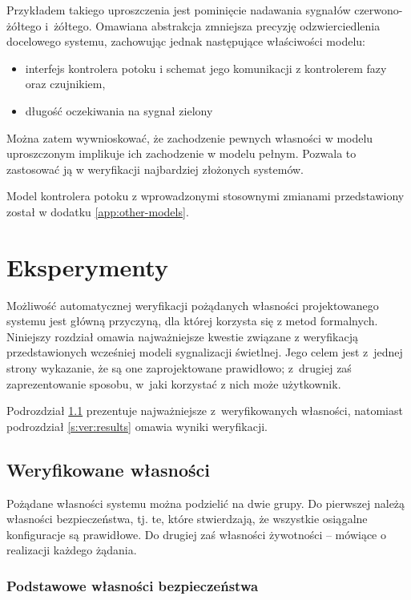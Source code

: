 \documentclass{pracamgr}
\theoremstyle{plain}
\begin{document}
Przykładem takiego uproszczenia jest pominięcie nadawania sygnałów
czerwono-żółtego i~żółtego. Omawiana abstrakcja zmniejsza precyzję
odzwierciedlenia docelowego systemu, zachowując jednak
następujące właściwości modelu:
\begin{itemize}
  \item interfejs kontrolera potoku i schemat jego komunikacji z
  kontrolerem fazy oraz czujnikiem,
  \item długość oczekiwania na sygnał zielony
\end{itemize}
Można zatem wywnioskować, że zachodzenie pewnych własności w modelu
uproszczonym implikuje ich zachodzenie w modelu pełnym. Pozwala to
zastosować ją w weryfikacji najbardziej złożonych systemów.

Model kontrolera potoku z wprowadzonymi stosownymi zmianami
przedstawiony został w dodatku \ref{app:other-models}.
\chapter{Eksperymenty}
\label{c:ver}
Możliwość automatycznej weryfikacji pożądanych własności
projektowanego systemu jest główną przyczyną, dla której korzysta się
z metod formalnych. Niniejszy rozdział omawia najważniejsze kwestie
związane z weryfikacją przedstawionych wcześniej modeli sygnalizacji
świetlnej. Jego celem jest z~jednej strony wykazanie, że są one
zaprojektowane prawidłowo; z~drugiej zaś zaprezentowanie sposobu,
w~jaki korzystać z nich może użytkownik.

Podrozdział \ref{s:ver:properties} prezentuje najważniejsze
z~weryfikowanych własności, natomiast podrozdział \ref{s:ver:results}
omawia wyniki weryfikacji.

\section{Weryfikowane własności}
\label{s:ver:properties}

Pożądane własności systemu można podzielić na dwie grupy. Do pierwszej
należą własności bezpieczeństwa, tj. te, które stwierdzają, że
wszystkie osiągalne konfiguracje są prawidłowe. Do drugiej zaś
własności żywotności -- mówiące o realizacji każdego żądania.

\subsection{Podstawowe własności bezpieczeństwa}
\label{s:ver:properties:safety}
\end{document}

